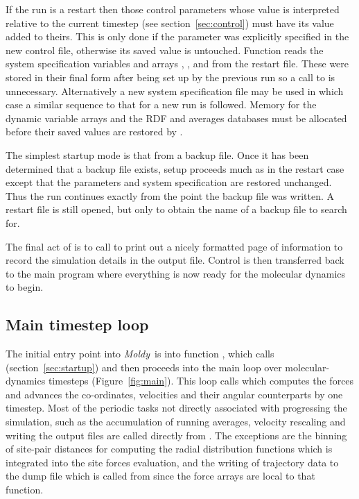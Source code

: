 \documentclass[a4paper,twoside]{report}
\newcommand{\moldy}{\emph{Moldy}}
\begin{document}
If the run is a restart then those control parameters whose value is
interpreted relative to the current timestep (see
section~\ref{sec:control}) must have its value added to theirs.  This
is only done if the parameter was explicitly specified in the new
control file, otherwise its saved value is untouched.  Function
 reads the system specification variables and
arrays , ,  and
 from the restart file.  These were stored in their
final form after being set up by the previous run so a call to
 is unnecessary.  Alternatively a new system
specification file may be used in which case a similar sequence to
that for a new run is followed.  Memory for the dynamic variable
arrays and the RDF and averages databases must be allocated before
their saved values are restored by .

The simplest startup mode is that from a backup file.  Once it has
been determined that a backup file exists, setup proceeds much as in
the restart case except that the parameters and system specification
are restored unchanged.  Thus the run continues exactly from the
point the backup file was written. A restart file is still opened, but
only to obtain the name of a backup file to search for.

The final act of  is to call 
to print out a nicely formatted page of information to record the
simulation details in the output file.  Control is then transferred
back to the main program where everything is now ready for the
molecular dynamics to begin.


\subsection{Main timestep loop}

The initial entry point into \moldy\ is into function ,
which calls  (section~\ref{sec:startup}) and then
proceeds into the main loop over molecular-dynamics timesteps
(Figure~\ref{fig:main}).  This loop calls  which
computes the forces and advances the co-ordinates, velocities and
their angular counterparts by one timestep.  Most of the periodic
tasks not directly associated with progressing the simulation, such as
the accumulation of running averages, velocity rescaling and writing
the output files are called directly from .
The exceptions are the binning of site-pair distances for computing
the radial distribution functions which is integrated into the site
forces evaluation, and the writing of trajectory data to the dump file
which is called from  since the force arrays are
local to that function.
\end{document}
